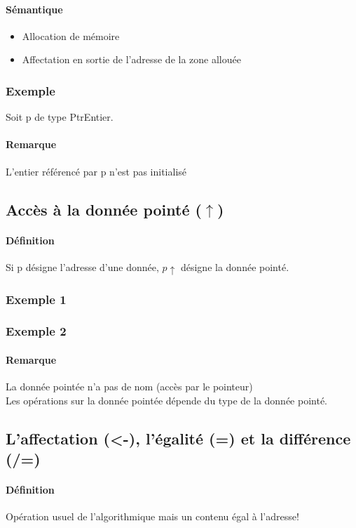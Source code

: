 	\paragraph{Sémantique}
			\begin{itemize}
				\item Allocation de mémoire
				\item Affectation en sortie de l'adresse de la zone allouée
			\end{itemize}	
	\subsubsection{Exemple}
		Soit p de type PtrEntier.	
		
	
		\paragraph{Remarque}
			L'entier référencé par p n'est pas initialisé
\subsection{Accès à la donnée pointé ($\uparrow$)}
	\paragraph{Définition}
		Si p désigne l'adresse d'une donnée, $p\uparrow$ désigne la donnée pointé.
	\subsubsection{Exemple 1}
		
		
		
	\subsubsection{Exemple 2}
		
		
		
		
		
		\paragraph{Remarque}
			La donnée pointée n'a pas de nom (accès par le pointeur) \\
			Les opérations sur la donnée pointée dépende du type de la donnée pointé.
	\subsection{L'affectation (<-), l'égalité (=) et la différence (/=)}
		\paragraph{Définition}
			Opération usuel de l'algorithmique mais un contenu égal à l'adresse!
